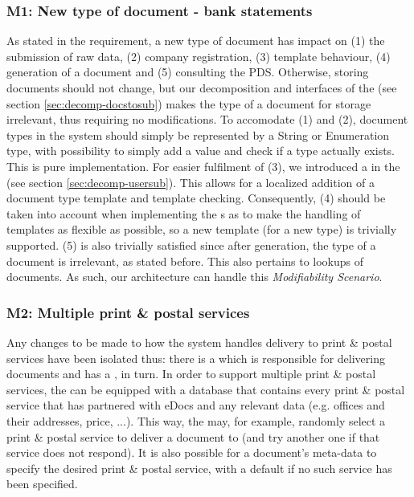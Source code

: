 \subsubsection{M1: New type of document - bank statements}\label{march:m1}
As stated in the requirement, a new type of document has impact on (1) the submission of raw data, (2) company registration, (3) template behaviour, (4) generation of a document and (5) consulting the PDS. Otherwise, storing documents should not change, but our decomposition and interfaces of the  (see section \ref{sec:decomp-docstosub}) makes the type of a document for storage irrelevant, thus requiring no modifications. To accomodate (1) and (2), document types in the system should simply be represented by a String or Enumeration type, with possibility to simply add a value and check if a type actually exists. This is pure implementation. For easier fulfilment of (3), we introduced a  in the  (see section \ref{sec:decomp-usersub}). This allows for a localized addition of a document type template and template checking. Consequently, (4) should be taken into account when implementing the s as to make the handling of templates as flexible as possible, so a new template (for a new type) is trivially supported. (5) is also trivially satisfied since after generation, the type of a document is irrelevant, as stated before. This also pertains to lookups of documents. As such, our architecture can handle this \emph{Modifiability Scenario}.

\subsubsection{M2: Multiple print \& postal services}\label{march:m2}
Any changes to be made to how the system handles delivery to print \& postal services have been isolated thus: there is a  which is responsible for delivering documents and has a , in turn. In order to support multiple print \& postal services, the  can be equipped with a database that contains every print \& postal service that has partnered with eDocs and any relevant data (e.g. offices and their addresses, price, ...). This way, the  may, for example, randomly select a print \& postal service to deliver a document to (and try another one if that service does not respond). It is also possible for a document's meta-data to specify the desired print \& postal service, with a default if no such service has been specified.

